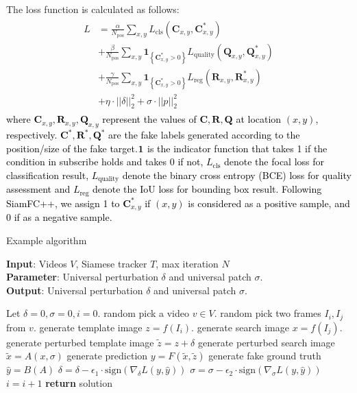 \documentclass{article}
\begin{document}
The loss function is calculated as follows:
\begin{equation}
\begin{array}{l}
\begin{aligned}
L&=\frac{\alpha}{N_{\mathrm{pos}}} \sum_{x, y} L_{\mathrm{cls}}\left(\textbf{C}_{x, y}, \textbf{C}_{x, y}^{*}\right) \\
&+\frac{\beta}{N_{\mathrm{pos}}} \sum_{x, y} \textbf{1}_{\left\{\textbf{C}_{x, y}^{*}>0\right\}} L_{\mathrm{quality}}\left(\textbf{Q}_{x, y}, \textbf{Q}_{x, y}^{*}\right) \\
&+\frac{\gamma}{N_{\mathrm{pos}}} \sum_{x, y} \textbf{1}_{\left\{\textbf{C}_{x, y}^{*}>0\right\}} L_{\mathrm{reg}}\left(\textbf{R}_{x, y}, \textbf{R}_{x, y}^{*}\right) \\
&+\eta \cdot ||\delta||_2^2 +  \sigma \cdot ||p||^2_2
\end{aligned}
\end{array}
\end{equation}
\textcolor{black} %
{where $\textbf{C}_{x, y}, \textbf{R}_{x, y}, \textbf{Q}_{x, y}$ represent the values of $\textbf{C}, \textbf{R}, \textbf{Q}$ at location $(x, y)$, respectively. $\textbf{C}^*, \textbf{R}^*, \textbf{Q}^*$ are the fake labels generated according to the position/size of the fake target.$\textbf 1$ is the indicator function that takes 1 if the condition in subscribe holds and takes 0 if not, $L_{\mathrm{cls}}$ denote the focal loss \cite{focal} for classification result, $L_{\mathrm{quality}}$ denote the binary cross entropy (BCE) loss for quality assessment and $L_{\mathrm{reg}}$ denote the IoU loss \cite{iou-loss} for bounding box result. Following SiamFC++, we assign 1 to $\textbf{C}_{x, y}^{*}$ if $(x, y)$ is considered as a positive sample, and 0 if as a negative sample.}

\begin{algorithm}[tb]
\caption{Example algorithm}
\label{alg:algorithm}
\textbf{Input}: Videos $V$, Siamese tracker $T$, max iteration $N$\\
\textbf{Parameter}: Universal perturbation $\delta$ and universal patch $\sigma$.\\
\textbf{Output}: Universal perturbation $\delta$ and universal patch $\sigma$.
\begin{algorithmic}[1] %
\STATE Let $\delta=0, \sigma=0, i = 0$.
\STATE random pick a video $v\in V$.
\STATE random pick two frames $I_i, I_j$ from $v$.
\STATE generate template image $z = f(I_i)$.
\STATE generate search image $x = f(I_j)$.
\STATE generate perturbed template image $\tilde z = z + \delta$
\STATE generate perturbed search image $\tilde x = A(x, \sigma)$
\STATE generate prediction $y = F(\tilde x, \tilde z)$
\STATE generate fake ground truth $\hat y = B(A)$
\STATE $\delta = \delta - \epsilon_1\cdot\text{sign}(\nabla_{\delta}L(y, \hat y))$
\STATE $\sigma = \sigma - \epsilon_2 \cdot \text{sign}(\nabla_{\sigma}L(y, \hat y))$
\STATE $i = i + 1$
\ENDWHILE
\STATE \textbf{return} solution
\end{algorithmic}
\end{algorithm}
\end{document}
